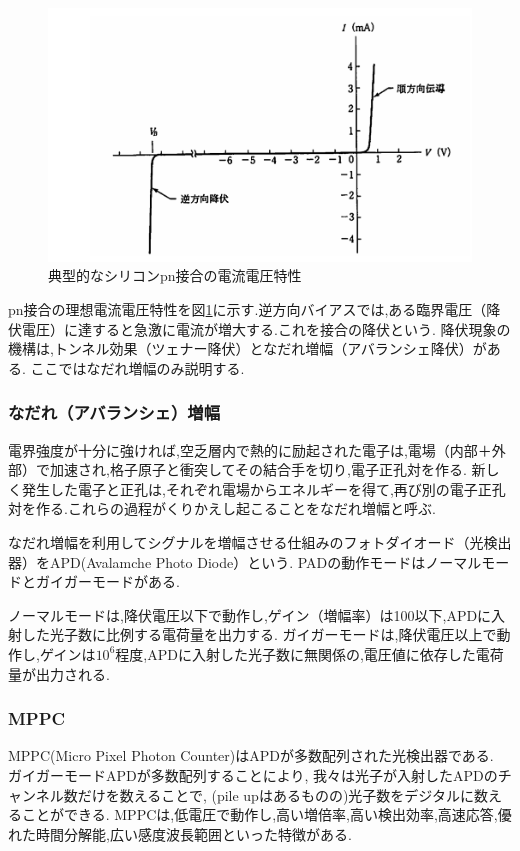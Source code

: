 \begin{figure}[h]
  \begin{center}
    \includegraphics[width=12cm]{../pnjunction_IV.png}
  \end{center}
  \caption{典型的なシリコンpn接合の電流電圧特性}\label{fig.pnIV}
\end{figure}

pn接合の理想電流電圧特性を図\ref{fig.pnIV}に示す.逆方向バイアスでは,ある臨界電圧（降伏電圧）に達すると急激に電流が増大する.これを接合の降伏という.
降伏現象の機構は,トンネル効果（ツェナー降伏）となだれ増幅（アバランシェ降伏）がある.
ここではなだれ増幅のみ説明する.

\subsubsection{なだれ（アバランシェ）増幅}

電界強度が十分に強ければ,空乏層内で熱的に励起された電子は,電場（内部＋外部）で加速され,格子原子と衝突してその結合手を切り,電子正孔対を作る.
新しく発生した電子と正孔は,それぞれ電場からエネルギーを得て,再び別の電子正孔対を作る.これらの過程がくりかえし起こることをなだれ増幅と呼ぶ.

なだれ増幅を利用してシグナルを増幅させる仕組みのフォトダイオード（光検出器）をAPD(Avalamche Photo Diode）という.
PADの動作モードはノーマルモードとガイガーモードがある.

ノーマルモードは,降伏電圧以下で動作し,ゲイン（増幅率）は100以下,APDに入射した光子数に比例する電荷量を出力する.
ガイガーモードは,降伏電圧以上で動作し,ゲインは$10^6$程度,APDに入射した光子数に無関係の,電圧値に依存した電荷量が出力される.

\subsubsection{MPPC}
MPPC(Micro Pixel Photon Counter)はAPDが多数配列された光検出器である.
ガイガーモードAPDが多数配列することにより, 我々は光子が入射したAPDのチャンネル数だけを数えることで, (pile upはあるものの)光子数をデジタルに数えることができる.
MPPCは,低電圧で動作し,高い増倍率,高い検出効率,高速応答,優れた時間分解能,広い感度波長範囲といった特徴がある.

